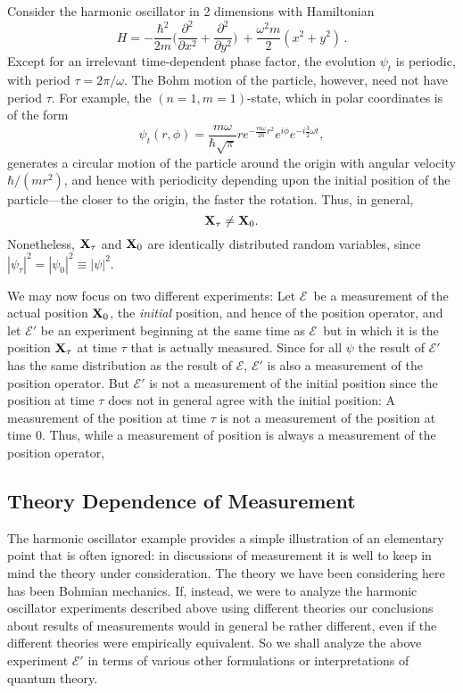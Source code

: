 \documentclass[12pt]{article}
\newcommand{\E}{\mbox{$\mathscr{E}$}}
\begin{document}
Consider the harmonic oscillator in 2 dimensions with Hamiltonian
$$H = -\frac{\hbar^2}{2m}\big( \frac{\partial^2}{\partial x^2} +
\frac{\partial^2}{\partial y^2}\big) \ + \frac{\omega^2 m}{2} (x^2
+y^2)\,.
$$
Except for an irrelevant time-dependent phase factor, the evolution
$\psi_t$ is periodic, with period $\tau =2\pi/\omega$.  The Bohm
motion of the particle, however, need not have period $\tau$. For
example, the $(n=1, m=1)$-state, which in polar coordinates is of the
form
\begin{equation}
\psi_t (r, \phi)
=\frac{m\omega}{\hbar\sqrt \pi} r e^{-\frac{m\omega}{2\hbar}r^2}
e^{i\phi}e^{-i\frac 32 \omega t},
\label{nm}
\end{equation}
generates a circular motion of the particle around the origin with
angular velocity $\hbar/(mr^2)$, and hence with periodicity depending
upon the initial position of the particle---the closer to the origin,
the faster the rotation. Thus, in general, $${\bf X}_\tau \neq {\bf
   X}_0.$$
Nonetheless, ${\bf X}_\tau$ and ${\bf X}_0 $ are identically
distributed random variables, since
$|\psi_\tau|^2=|\psi_0|^2\equiv|\psi|^2$.

We may now focus on two different experiments: Let \E\ be a
measurement of the actual position ${\bf X}_0$, the {\it initial\/}
position, and hence of the position operator, and let $\E'$ be an
experiment beginning at the same time as \E\ but in which it is the
position ${\bf X}_\tau$ at time $\tau$ that is actually measured.
Since for all $\psi$ the result of $\E'$ has the same distribution as
the result of \E, $\E'$ is also a measurement of the position
operator.  But $\E'$ is not a measurement of the initial position
since the position at time $\tau$ does not in general agree with the
initial position: A measurement of the position at time $\tau$ is not
a measurement of the position at time $0$.  Thus, while a measurement
of position is always a measurement of the position operator,
\begin{quotation}\setlength{\baselineskip}{12pt}
\end{quotation}


\subsection{Theory Dependence of Measurement}

The harmonic oscillator example provides a simple illustration of an
elementary point that is often ignored: in discussions of measurement
it is well to keep in mind the theory under consideration. The theory
we have been considering here has been Bohmian mechanics. If, instead,
we were to analyze the harmonic oscillator experiments described above
using different theories our conclusions about results of measurements
would in general be rather different, even if the different theories
were empirically equivalent. So we shall analyze the above experiment
$\E'$ in terms of various other formulations or interpretations of
quantum theory.
\end{document}
